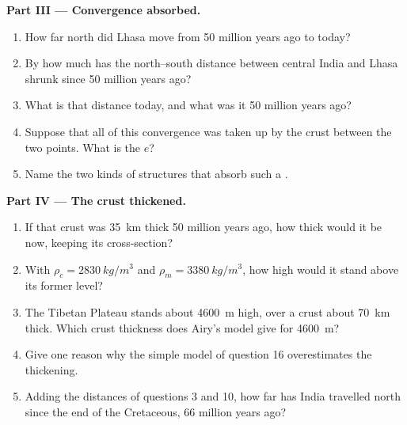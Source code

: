 \begin{problem}
\medskip
\noindent\textbf{Part III --- Convergence absorbed.}
\begin{enumerate}[resume]
  \item How far north did Lhasa move from 50 million years ago to today?
  \item By how much has the north--south distance between central India and
        Lhasa shrunk since 50 million years ago?
  \item What is that distance today, and what was it 50 million years ago?
  \item Suppose that all of this convergence was taken up by  the
        crust between the two points. What is the  $e$?
  \item Name the two kinds of structures that absorb such a .
\end{enumerate}

\medskip
\noindent\textbf{Part IV --- The crust thickened.}
\begin{enumerate}[resume]
  \item If that crust was \qty{35}{km} thick 50 million years ago, how thick
        would it be now, keeping its cross-section?
  \item With $\rho_c = \qty{2830}{kg/m^3}$ and $\rho_m = \qty{3380}{kg/m^3}$,
        how high would it stand above its former level?
  \item The Tibetan Plateau stands about \qty{4600}{m} high, over a crust
        about \qty{70}{km} thick. Which crust thickness does Airy's model give
        for \qty{4600}{m}?
  \item Give one reason why the simple model of question 16 overestimates
        the thickening.
  \item Adding the distances of questions 3 and 10, how far has India
        travelled north since the end of the Cretaceous, 66 million years
        ago?
\end{enumerate}
\end{problem}
